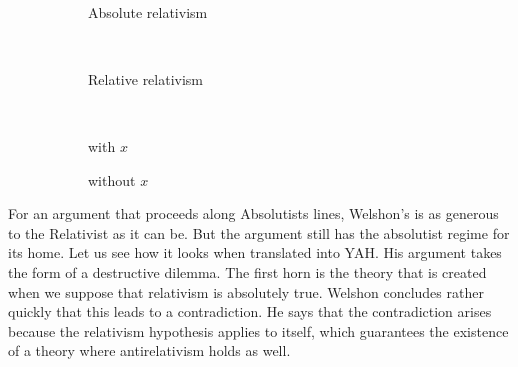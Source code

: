 \documentclass[12pt]{article}
\begin{document}
\begin{flushleft}
\begin{figure}[h]
\begin{subfigure}{.25\textwidth}
    \fitchprf
    {
    }
    {
        \subproof
        {
        }
        {
            \pline{\bigstar}\\
            \subproof
            {
            }
            {
                \pline{\lfalse}
            }
        }
    }
    \caption{Absolute relativism}
    \label{abs_rel}
\end{subfigure}%
\begin{subfigure}{.25\textwidth}
    \fitchctx
    {
        \pline{\bigstar}\\
        \subproof
        {
        }
        {
            \subproof
            {
            }
            {
                \pline{}
            }
            \subproof
            {
            }
            {
                \pline{}
            }
        }
        \subproof
        {
        }
        {
            \subproof
            {
            }
            {
                \pline{}
            }
        }
    }
    \caption{Relative relativism}
    \label{rel_rel}
\end{subfigure}%
\begin{subfigure}{.25\textwidth}
    \hspace*{3em}%
    \fitchprf
    {
             \\
    }
    {
        \pline{\bigstar}
    }
    \caption{with $x$}
    \label{antirel_populated}
\end{subfigure}%
\begin{subfigure}{.25\textwidth}
    \hspace*{3em}%
    \fitchprf
    {
    }
    {
        \pline{\bigstar}
    }
    \caption{without $x$}
    \label{antirel_unpopulated}
\end{subfigure}
\caption{}
\label{welshon}
\end{figure}

For an argument that proceeds along Absolutists lines, Welshon's is as generous to the Relativist as it can be.
But the argument still has the absolutist regime for its home.
Let us see how it looks when translated into YAH.
His argument takes the form of a destructive dilemma.
The first horn is the theory that is created when we suppose that relativism is absolutely true.
Welshon concludes rather quickly that this leads to a contradiction.
He says that the contradiction arises because the relativism hypothesis applies to itself, which guarantees the existence of a theory where antirelativism holds as well.


\end{flushleft}
\end{document}
